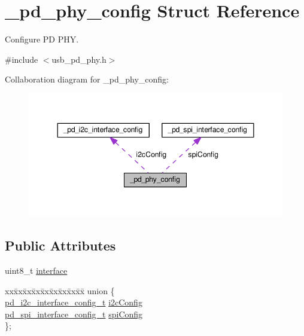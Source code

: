 \hypertarget{struct__pd__phy__config}{\section{\-\_\-pd\-\_\-phy\-\_\-config Struct Reference}
\label{struct__pd__phy__config}
}


Configure P\-D P\-H\-Y.  




{\ttfamily \#include $<$usb\-\_\-pd\-\_\-phy.\-h$>$}



Collaboration diagram for \-\_\-pd\-\_\-phy\-\_\-config\-:
\nopagebreak
\begin{figure}[H]
\begin{center}
\leavevmode
\includegraphics[width=347pt]{struct__pd__phy__config__coll__graph}
\end{center}
\end{figure}
\subsection*{Public Attributes}
\begin{DoxyCompactItemize}
\item 
uint8\-\_\-t \hyperlink{struct__pd__phy__config_aa5aa79cabb041cefecc0483c840f75a1}{interface}
\item 
\begin{tabbing}
xx\=xx\=xx\=xx\=xx\=xx\=xx\=xx\=xx\=\kill
union \{\\
\>\hyperlink{group__usb__pd__cmsis__wrapper_gada87adb00aefcd83988ef970c2f4d750}{pd\_i2c\_interface\_config\_t} \hyperlink{struct__pd__phy__config_aa606732850969dd6c9bd06b608e8015c}{i2cConfig}\\
\>\hyperlink{group__usb__pd__cmsis__wrapper_ga0a6afc9ea2599bcbe9b60e47f60d6bed}{pd\_spi\_interface\_config\_t} \hyperlink{struct__pd__phy__config_a5e3478079386b40d5b795897396853cb}{spiConfig}\\
\}; \\

\end{tabbing}\end{DoxyCompactItemize}


